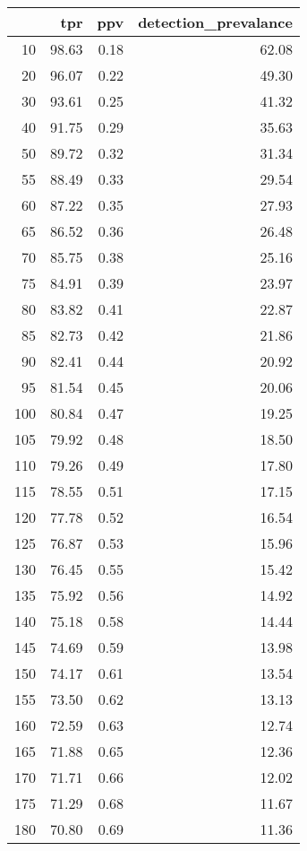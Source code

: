 \begin{table}[ht]
\centering
\begin{tabular}{rrrr}
  \hline
 & tpr & ppv & detection\_prevalance \\ 
  \hline
  10 & 98.63 & 0.18 & 62.08 \\ 
    20 & 96.07 & 0.22 & 49.30 \\ 
    30 & 93.61 & 0.25 & 41.32 \\ 
    40 & 91.75 & 0.29 & 35.63 \\ 
    50 & 89.72 & 0.32 & 31.34 \\ 
    55 & 88.49 & 0.33 & 29.54 \\ 
    60 & 87.22 & 0.35 & 27.93 \\ 
    65 & 86.52 & 0.36 & 26.48 \\ 
    70 & 85.75 & 0.38 & 25.16 \\ 
    75 & 84.91 & 0.39 & 23.97 \\ 
    80 & 83.82 & 0.41 & 22.87 \\ 
    85 & 82.73 & 0.42 & 21.86 \\ 
    90 & 82.41 & 0.44 & 20.92 \\ 
    95 & 81.54 & 0.45 & 20.06 \\ 
   100 & 80.84 & 0.47 & 19.25 \\ 
   105 & 79.92 & 0.48 & 18.50 \\ 
   110 & 79.26 & 0.49 & 17.80 \\ 
   115 & 78.55 & 0.51 & 17.15 \\ 
   120 & 77.78 & 0.52 & 16.54 \\ 
   125 & 76.87 & 0.53 & 15.96 \\ 
   130 & 76.45 & 0.55 & 15.42 \\ 
   135 & 75.92 & 0.56 & 14.92 \\ 
   140 & 75.18 & 0.58 & 14.44 \\ 
   145 & 74.69 & 0.59 & 13.98 \\ 
   150 & 74.17 & 0.61 & 13.54 \\ 
   155 & 73.50 & 0.62 & 13.13 \\ 
   160 & 72.59 & 0.63 & 12.74 \\ 
   165 & 71.88 & 0.65 & 12.36 \\ 
   170 & 71.71 & 0.66 & 12.02 \\ 
   175 & 71.29 & 0.68 & 11.67 \\ 
   180 & 70.80 & 0.69 & 11.36 \\ 

\end{tabular}
\end{table}
